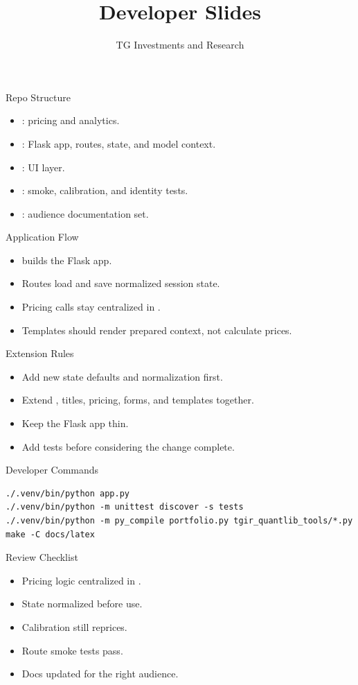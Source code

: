 \documentclass[aspectratio=169]{beamer}
\title{Developer Slides}
\subtitle{\product}
\author{TG Investments and Research}
\date{\docdate}
\begin{document}
\frame{\titlepage}

\begin{frame}{Repo Structure}
\begin{itemize}
    \item {}: pricing and analytics.
    \item {}: Flask app, routes, state, and model context.
    \item {}: UI layer.
    \item {}: smoke, calibration, and identity tests.
    \item {}: audience documentation set.
\end{itemize}
\end{frame}

\begin{frame}{Application Flow}
\begin{itemize}
    \item {} builds the Flask app.
    \item Routes load and save normalized session state.
    \item Pricing calls stay centralized in .
    \item Templates should render prepared context, not calculate prices.
\end{itemize}
\end{frame}

\begin{frame}{Extension Rules}
\begin{itemize}
    \item Add new state defaults and normalization first.
    \item Extend , titles, pricing, forms, and templates together.
    \item Keep the Flask app thin.
    \item Add tests before considering the change complete.
\end{itemize}
\end{frame}

\begin{frame}[fragile]{Developer Commands}
\begin{lstlisting}
./.venv/bin/python app.py
./.venv/bin/python -m unittest discover -s tests
./.venv/bin/python -m py_compile portfolio.py tgir_quantlib_tools/*.py
make -C docs/latex
\end{lstlisting}
\end{frame}

\begin{frame}{Review Checklist}
\begin{itemize}
    \item Pricing logic centralized in .
    \item State normalized before use.
    \item Calibration still reprices.
    \item Route smoke tests pass.
    \item Docs updated for the right audience.
\end{itemize}
\end{frame}
\end{document}

